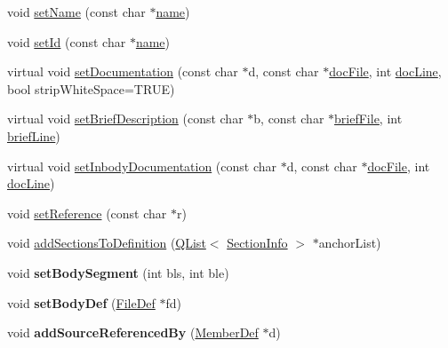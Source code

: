 \begin{DoxyCompactItemize}
\item 
void \hyperlink{class_definition_ab3a256e7d9fad73fa57de7c1fedf51c5}{set\-Name} (const char $\ast$\hyperlink{class_definition_a2c310e06c9aadc6fb218f80fcbb5c695}{name})
\item 
void \hyperlink{class_definition_aa8915a727f5acd71a7e264d86e888835}{set\-Id} (const char $\ast$\hyperlink{class_definition_a2c310e06c9aadc6fb218f80fcbb5c695}{name})
\item 
virtual void \hyperlink{class_definition_a49660f42e3320c1022ef04edfbc7c850}{set\-Documentation} (const char $\ast$d, const char $\ast$\hyperlink{class_definition_afadeeb679bb7bda0ad5b4f358f0d33e2}{doc\-File}, int \hyperlink{class_definition_a3c2a6c87ac432d8a6db51bc52b2379da}{doc\-Line}, bool strip\-White\-Space=T\-R\-U\-E)
\item 
virtual void \hyperlink{class_definition_a98a2e802a5477e4ece9cd859cb07ec31}{set\-Brief\-Description} (const char $\ast$b, const char $\ast$\hyperlink{class_definition_a14b9cbdcc30535bcfd2e435667dea5fe}{brief\-File}, int \hyperlink{class_definition_aca87df70fcd505c2458a6ad75a1ede61}{brief\-Line})
\item 
virtual void \hyperlink{class_definition_ae1d28023753b529dd5a2c5d77e076843}{set\-Inbody\-Documentation} (const char $\ast$d, const char $\ast$\hyperlink{class_definition_afadeeb679bb7bda0ad5b4f358f0d33e2}{doc\-File}, int \hyperlink{class_definition_a3c2a6c87ac432d8a6db51bc52b2379da}{doc\-Line})
\item 
void \hyperlink{class_definition_a194917eb0e2f76ca5575658b55982c19}{set\-Reference} (const char $\ast$r)
\item 
void \hyperlink{class_definition_a5dff1a1ee0bf59807d724b07a99aad6d}{add\-Sections\-To\-Definition} (\hyperlink{class_q_list}{Q\-List}$<$ \hyperlink{struct_section_info}{Section\-Info} $>$ $\ast$anchor\-List)
\item 
\hypertarget{class_definition_ab075bb8e6647768c630064feac926b6d}{void {\bfseries set\-Body\-Segment} (int bls, int ble)}\label{class_definition_ab075bb8e6647768c630064feac926b6d}

\item 
\hypertarget{class_definition_a55f5ec0489ebade250ca45bc47ddcb9d}{void {\bfseries set\-Body\-Def} (\hyperlink{class_file_def}{File\-Def} $\ast$fd)}\label{class_definition_a55f5ec0489ebade250ca45bc47ddcb9d}

\item 
\hypertarget{class_definition_a50c00beeefc48cb6e38f299c677f3600}{void {\bfseries add\-Source\-Referenced\-By} (\hyperlink{class_member_def}{Member\-Def} $\ast$d)}\label{class_definition_a50c00beeefc48cb6e38f299c677f3600}


\end{DoxyCompactItemize}
